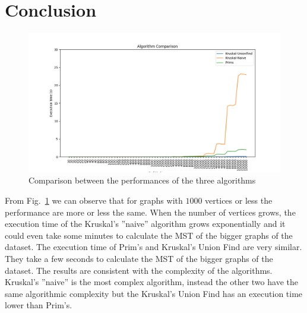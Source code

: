 \section{Conclusion}

\begin{figure}[H]
	\hspace{-1cm}\includegraphics[width=19cm]{Img/AlgorithmComparison_Graph.png}
	\caption{Comparison between the performances of the three algorithms }
	\label{comparison}
\end{figure}

From Fig.~\ref{comparison} we can observe that for graphs with $1000$ vertices or less the performance are more or less the same.
When the number of vertices grows, the execution time of the Kruskal's ''naive'' algorithm grows exponentially and it could even take some minutes to calculate the MST of the bigger graphs of the dataset.
The execution time of Prim's and Kruskal's Union Find are very similar.
They take a few seconds to calculate the MST of the bigger graphs of the dataset. 
The results are consistent with the complexity of the algorithms.
Kruskal's ''naive'' is the most complex algorithm, instead the other two have the same algorithmic complexity but the Kruskal's Union Find has an execution time lower than Prim's.


\pagebreak